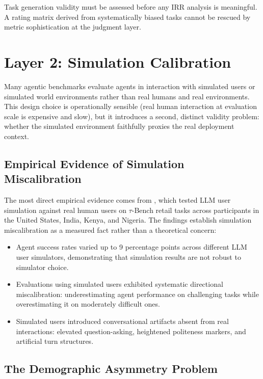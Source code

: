\documentclass[preprint,12pt]{elsarticle}
\begin{document}
Task generation validity must be assessed before any IRR analysis is meaningful. A
rating matrix derived from systematically biased tasks cannot be rescued by metric
sophistication at the judgment layer.

\section{Layer 2: Simulation Calibration}
\label{sec:layer2}

Many agentic benchmarks evaluate agents in interaction with simulated users or
simulated world environments rather than real humans and real environments. This
design choice is operationally sensible (real human interaction at evaluation scale
is expensive and slow), but it introduces a second, distinct validity problem:
whether the simulated environment faithfully proxies the real deployment context.

\subsection{Empirical Evidence of Simulation Miscalibration}
\label{sec:sim-evidence}

The most direct empirical evidence comes from \citet{seshadri2026}, which tested
LLM user simulation against real human users on $\tau$-Bench retail tasks across
participants in the United States, India, Kenya, and Nigeria. The findings establish
simulation miscalibration as a measured fact rather than a theoretical concern:

\begin{itemize}
  \item Agent success rates varied up to 9 percentage points across different LLM
    user simulators, demonstrating that simulation results are not robust to
    simulator choice.
  \item Evaluations using simulated users exhibited systematic directional
    miscalibration: underestimating agent performance on challenging tasks while
    overestimating it on moderately difficult ones.
  \item Simulated users introduced conversational artifacts absent from real
    interactions: elevated question-asking, heightened politeness markers, and
    artificial turn structures.
\end{itemize}

\subsection{The Demographic Asymmetry Problem}
\label{sec:demographic}
\end{document}
